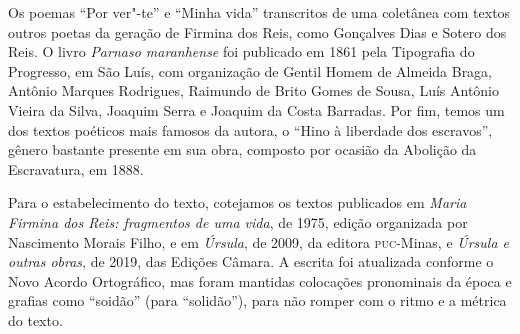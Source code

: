 Os poemas ``Por ver"-te'' e ``Minha vida'' transcritos de uma coletânea
com textos outros poetas da geração de Firmina dos Reis, como Gonçalves
Dias e Sotero dos Reis. O livro \emph{Parnaso maranhense} foi publicado
em 1861 pela Tipografia do Progresso, em São Luís, com organização de
Gentil Homem de Almeida Braga, Antônio Marques Rodrigues, Raimundo de
Brito Gomes de Sousa, Luís Antônio Vieira da Silva, Joaquim Serra e
Joaquim da Costa Barradas. Por fim, temos um dos textos poéticos mais
famosos da autora, o ``Hino à liberdade dos escravos'', gênero bastante
presente em sua obra, composto por ocasião da Abolição da Escravatura,
em 1888.

Para o estabelecimento do texto, cotejamos os textos publicados em
\emph{Maria Firmina dos Reis: fragmentos de uma vida}, de 1975, edição
organizada por Nascimento Morais Filho, e em \emph{Úrsula}, de 2009, da
editora \textsc{puc}-Minas, e \emph{Úrsula e outras obras}, de 2019, das Edições
Câmara. A escrita foi atualizada conforme o Novo Acordo Ortográfico, mas
foram mantidas colocações pronominais da época e grafias como ``soidão''
(para ``solidão''), para não romper com o ritmo e a métrica do texto.